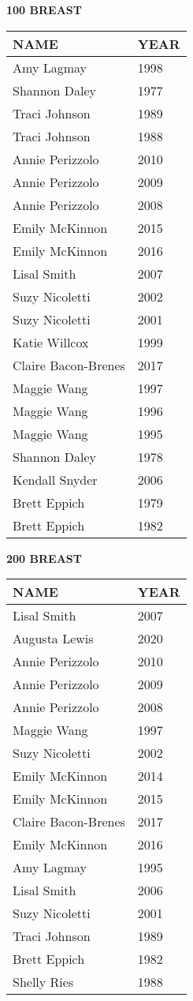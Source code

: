 \begin{minipage}[t]{0.48\textwidth}
\centering
\textbf{100 BREAST}\\[0.05cm]
\begin{tabular}{@{}p{2.8cm}p{1.2cm}@{}}
\hline
\textbf{NAME} & \textbf{YEAR} \\
\hline
Amy Lagmay & 1998 \\
Shannon Daley & 1977 \\
Traci Johnson & 1989 \\
Traci Johnson & 1988 \\
Annie Perizzolo & 2010 \\
Annie Perizzolo & 2009 \\
Annie Perizzolo & 2008 \\
Emily McKinnon & 2015 \\
Emily McKinnon & 2016 \\
Lisal Smith & 2007 \\
Suzy Nicoletti & 2002 \\
Suzy Nicoletti & 2001 \\
Katie Willcox & 1999 \\
Claire Bacon-Brenes & 2017 \\
Maggie Wang & 1997 \\
Maggie Wang & 1996 \\
Maggie Wang & 1995 \\
Shannon Daley & 1978 \\
Kendall Snyder & 2006 \\
Brett Eppich & 1979 \\
Brett Eppich & 1982 \\
\hline
\end{tabular}
\end{minipage}\hfill
\begin{minipage}[t]{0.48\textwidth}
\centering
\textbf{200 BREAST}\\[0.05cm]
\begin{tabular}{@{}p{2.8cm}p{1.2cm}@{}}
\hline
\textbf{NAME} & \textbf{YEAR} \\
\hline
Lisal Smith & 2007 \\
Augusta Lewis & 2020 \\
Annie Perizzolo & 2010 \\
Annie Perizzolo & 2009 \\
Annie Perizzolo & 2008 \\
Maggie Wang & 1997 \\
Suzy Nicoletti & 2002 \\
Emily McKinnon & 2014 \\
Emily McKinnon & 2015 \\
Claire Bacon-Brenes & 2017 \\
Emily McKinnon & 2016 \\
Amy Lagmay & 1995 \\
Lisal Smith & 2006 \\
Suzy Nicoletti & 2001 \\
Traci Johnson & 1989 \\
Brett Eppich & 1982 \\
Shelly Ries & 1988 \\
\hline
\end{tabular}
\end{minipage}

